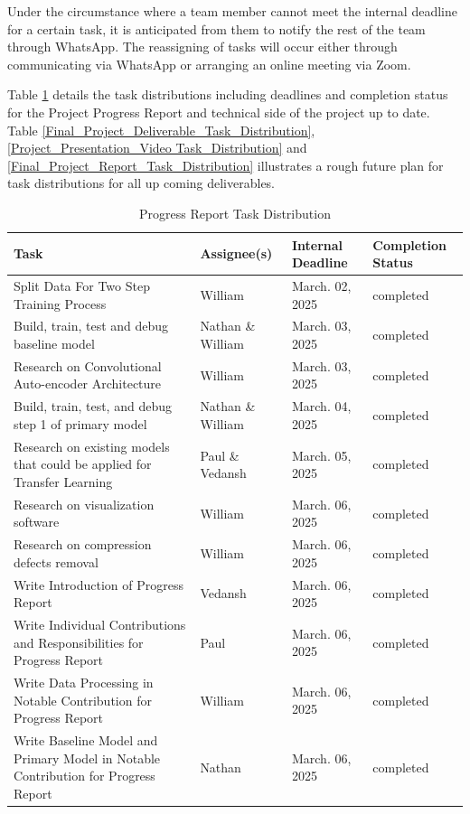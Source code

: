 \documentclass{article} %
\begin{document}
Under the circumstance where a team member cannot meet the internal deadline for a certain task, it is anticipated from them to notify the rest of the team through WhatsApp. The reassigning of tasks will occur either through communicating via WhatsApp or arranging an online meeting via Zoom.

Table \ref{Progress_Report_Task_Distribution} details the task distributions including deadlines and completion status for the Project Progress Report and technical side of the project up to date. Table \ref{Final_Project_Deliverable_Task_Distribution}, \ref{Project_Presentation_Video Task_Distribution} and \ref{Final_Project_Report_Task_Distribution} illustrates a rough future plan for task distributions for all up coming deliverables. 

\begin{table}[t]
    \caption{Progress Report Task Distribution}
    \label{Progress_Report_Task_Distribution}
    \begin{center}
    \begin{tabularx}{\textwidth}{|>{\raggedright\arraybackslash}X|>{\raggedright\arraybackslash}X|>{\raggedright\arraybackslash}X|>{\raggedright\arraybackslash}X|}
    \hline
    \textbf{Task} & \textbf{Assignee(s)} & \textbf{Internal Deadline} & \textbf{Completion Status} \\
    \hline
    Split Data For Two Step Training Process & William & March. 02, 2025 & completed \\
    \hline
    Build, train, test and debug baseline model & Nathan \& William & March. 03, 2025 & completed \\
    \hline
    Research on Convolutional Auto-encoder Architecture & William & March. 03, 2025 & completed \\
    \hline
    Build, train, test, and debug step 1 of primary model & Nathan \& William & March. 04, 2025 & completed \\
    \hline
    Research on existing models that could be applied for Transfer Learning & Paul \& Vedansh & March. 05, 2025 & completed \\
    \hline
    Research on visualization software & William & March. 06, 2025 & completed \\
    \hline
    Research on compression defects removal & William & March. 06, 2025 & completed \\
    \hline
    Write Introduction of Progress Report & Vedansh & March. 06, 2025 & completed \\
    \hline
    Write Individual Contributions and Responsibilities for Progress Report & Paul & March. 06, 2025 & completed \\
    \hline
    Write Data Processing in Notable Contribution for Progress Report & William & March. 06, 2025 & completed \\
    \hline
    Write Baseline Model and Primary Model in Notable Contribution for Progress Report & Nathan & March. 06, 2025 & completed \\
    \hline
    \end{tabularx}
    \end{center}
    \end{table}
\end{document}
